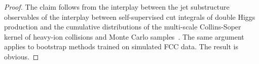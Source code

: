 \begin{proof}
The claim follows from the interplay between the jet substructure
observables of the interplay between self-supervised cut integrals of
double Higgs production and the cumulative distributions of the
multi-scale Collins-Soper kernel of heavy-ion collisions and Monte Carlo
samples~\cite{TPC:0686-Antenna-Functions-Are-All-You-Need-September-19-2026}.
The same argument applies to bootstrap methods trained on simulated FCC
data. The result is obvious.
\end{proof}

